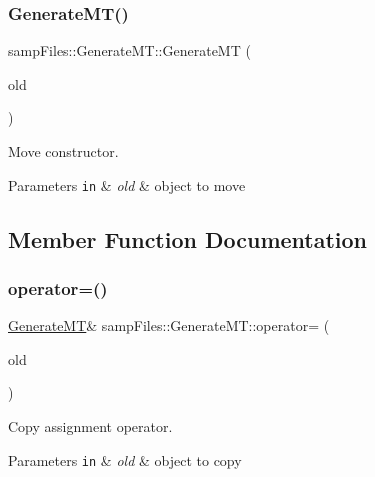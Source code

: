 \subsubsection{\texorpdfstring{Generate\+M\+T()}{GenerateMT()}\hspace{0.1cm}{\footnotesize\ttfamily [3/3]}}
{\footnotesize\ttfamily samp\+Files\+::\+Generate\+M\+T\+::\+Generate\+MT (\begin{DoxyParamCaption}\item[{\hyperlink{classsamp_files_1_1_generate_m_t}{Generate\+MT} \&\&}]{old }\end{DoxyParamCaption})\hspace{0.3cm}{\ttfamily [default]}}



Move constructor. 


\begin{DoxyParams}[1]{Parameters}
\mbox{\tt in}  & {\em old} & object to move \\
\hline
\end{DoxyParams}


\subsection{Member Function Documentation}
\mbox{\label{classsamp_files_1_1_generate_m_t_a37331925c0b909adc51188af1b80995a}} 
\subsubsection{\texorpdfstring{operator=()}{operator=()}\hspace{0.1cm}{\footnotesize\ttfamily [1/2]}}
{\footnotesize\ttfamily \hyperlink{classsamp_files_1_1_generate_m_t}{Generate\+MT}\& samp\+Files\+::\+Generate\+M\+T\+::operator= (\begin{DoxyParamCaption}\item[{const \hyperlink{classsamp_files_1_1_generate_m_t}{Generate\+MT} \&}]{old }\end{DoxyParamCaption})\hspace{0.3cm}{\ttfamily [default]}}



Copy assignment operator. 


\begin{DoxyParams}[1]{Parameters}
\mbox{\tt in}  & {\em old} & object to copy \\
\hline
\end{DoxyParams}
\mbox{\label{classsamp_files_1_1_generate_m_t_a7c633b7728fcadde846a4538484d286a}} 
